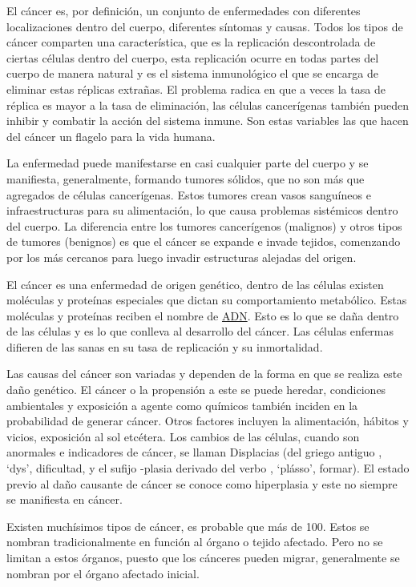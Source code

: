 
El cáncer es, por definición, un conjunto de enfermedades con diferentes
localizaciones dentro del cuerpo, diferentes síntomas y causas. Todos los tipos
de cáncer comparten una característica, que es la replicación descontrolada de
ciertas células dentro del cuerpo, esta replicación ocurre en todas partes del
cuerpo de manera natural y es el sistema inmunológico el que se encarga de
eliminar estas réplicas extrañas. El problema radica en que a veces la tasa de
réplica es mayor a la tasa de eliminación, las células cancerígenas también
pueden inhibir y combatir la acción del sistema inmune. Son estas variables las
que hacen del cáncer un flagelo para la vida humana.

La enfermedad puede manifestarse en casi cualquier parte del cuerpo y se
manifiesta, generalmente, formando tumores sólidos, que no son
más que agregados de células cancerígenas. Estos tumores crean vasos sanguíneos
e infraestructuras para su alimentación, lo que causa problemas sistémicos
dentro del cuerpo. La diferencia entre los tumores cancerígenos (malignos) y
otros tipos de tumores (benignos) es que el cáncer se expande e invade tejidos,
comenzando por los más cercanos para luego invadir estructuras alejadas del
origen.

El cáncer es una enfermedad de origen genético, dentro de las células existen
moléculas y proteínas especiales que dictan su comportamiento metabólico. Estas
moléculas y proteínas reciben el nombre de \hyperlink{abbr}{ADN}. Esto es lo que
se daña dentro de las células y es lo que conlleva al desarrollo del cáncer. Las
células enfermas difieren de las sanas en su tasa de replicación y su
inmortalidad.

Las causas del cáncer son variadas y dependen de la forma en que se realiza este
daño genético. El cáncer o la propensión a este se puede heredar, condiciones
ambientales y exposición a agente como químicos también inciden en la
probabilidad de generar cáncer. Otros factores incluyen la alimentación, hábitos
y vicios, exposición al sol etcétera. Los cambios de las células, cuando son
anormales e indicadores de cáncer, se llaman Displacias  (del
griego antiguo \textdelta\textupsilon\textvarsigma, `dys', dificultad, y el
sufijo -plasia derivado del verbo
\textpi\textlambda\textalpha\textsigma\textsigma\textomega, `plásso', formar).
El estado previo al daño causante de cáncer se conoce como hiperplasia y este no
siempre se manifiesta en cáncer.

Existen muchísimos tipos de cáncer, es probable que más de 100. Estos se nombran
tradicionalmente en función al órgano o tejido afectado. Pero no se limitan a
estos órganos, puesto que los cánceres pueden migrar, generalmente se nombran
por el órgano afectado inicial.

